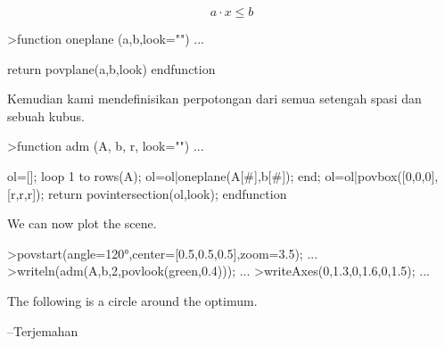 \documentclass{article}
\begin{document}
\begin{eulernotebook}
\begin{eulercomment}
\begin{eulercomment}
\begin{eulercomment}
\begin{eulercomment}
\begin{eulercomment}
\begin{eulercomment}
\begin{eulercomment}
\begin{eulercomment}
\begin{eulercomment}
\begin{eulercomment}
\begin{eulercomment}
\begin{eulercomment}
\begin{eulercomment}
\begin{eulercomment}
\begin{eulercomment}
\begin{eulercomment}
\begin{eulercomment}
\begin{eulercomment}
\begin{eulercomment}
\begin{eulercomment}
\begin{eulercomment}
\begin{eulercomment}
\begin{eulercomment}
\begin{eulercomment}
\begin{eulercomment}
\begin{eulercomment}
\begin{eulercomment}
\begin{eulercomment}
\begin{eulercomment}
\begin{eulercomment}
\begin{eulercomment}
\end{eulercomment}
\begin{eulerformula}
\[
a \cdot x \le b
\]
\end{eulerformula}
\begin{eulerprompt}
>function oneplane (a,b,look="") ...
\end{eulerprompt}
\begin{eulerudf}
    return povplane(a,b,look)
  endfunction
\end{eulerudf}
\begin{eulercomment}
Kemudian kami mendefinisikan perpotongan dari semua setengah spasi dan
sebuah kubus.
\end{eulercomment}
\begin{eulerprompt}
>function adm (A, b, r, look="") ...
\end{eulerprompt}
\begin{eulerudf}
    ol=[];
    loop 1 to rows(A); ol=ol|oneplane(A[#],b[#]); end;
    ol=ol|povbox([0,0,0],[r,r,r]);
    return povintersection(ol,look);
  endfunction
\end{eulerudf}
\begin{eulercomment}
We can now plot the scene.
\end{eulercomment}
\begin{eulerprompt}
>povstart(angle=120°,center=[0.5,0.5,0.5],zoom=3.5); ...
>writeln(adm(A,b,2,povlook(green,0.4))); ...
>writeAxes(0,1.3,0,1.6,0,1.5); ...
\end{eulerprompt}
\begin{eulercomment}
The following is a circle around the optimum.

--Terjemahan


\end{eulercomment}
\end{eulercomment}
\end{eulercomment}
\end{eulercomment}
\end{eulercomment}
\end{eulercomment}
\end{eulercomment}
\end{eulercomment}
\end{eulercomment}
\end{eulercomment}
\end{eulercomment}
\end{eulercomment}
\end{eulercomment}
\end{eulercomment}
\end{eulercomment}
\end{eulercomment}
\end{eulercomment}
\end{eulercomment}
\end{eulercomment}
\end{eulercomment}
\end{eulercomment}
\end{eulercomment}
\end{eulercomment}
\end{eulercomment}
\end{eulercomment}
\end{eulercomment}
\end{eulercomment}
\end{eulercomment}
\end{eulercomment}
\end{eulercomment}
\end{eulercomment}
\end{eulernotebook}
\end{document}
